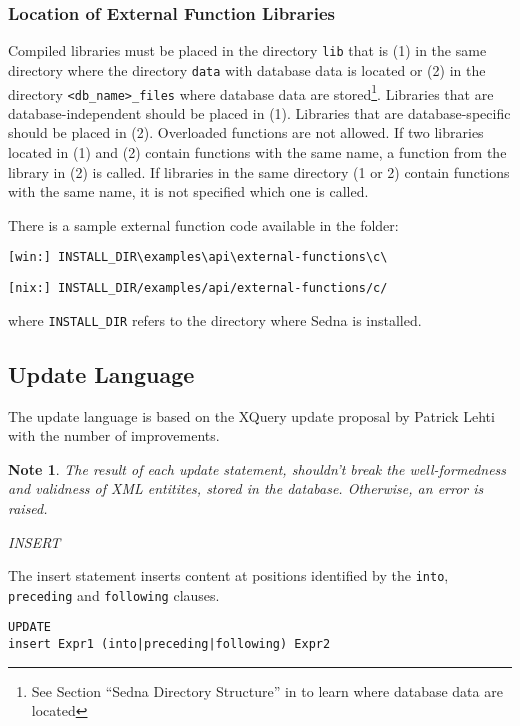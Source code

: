 \documentclass[a4paper,12pt]{article}
\newtheorem{note}{Note}
\begin{document}
\subsubsection*{Location of External Function Libraries}
Compiled libraries must be placed in the directory \verb!lib! that is (1) in the same directory
where the directory \verb!data! with database data is located or (2) in the directory \verb!<db_name>_files! where database data are stored\footnote{See Section ``Sedna Directory Structure'' in \cite{doc:admin} to learn where database data are located}. Libraries that are database-independent should be placed in (1). Libraries that are database-specific should be placed in (2). Overloaded functions are not allowed. If two libraries located in (1) and (2) contain functions with the same name, a function from the library in (2) is called. If libraries in the same directory (1 or 2) contain functions with the same name, it is not specified which one is called.

There is a sample external function code available in the folder:
\begin{verbatim}
[win:] INSTALL_DIR\examples\api\external-functions\c\
\end{verbatim}
\begin{verbatim}
[nix:] INSTALL_DIR/examples/api/external-functions/c/
\end{verbatim}
where \verb!INSTALL_DIR! refers to the directory where Sedna is installed.


\subsection{Update Language}
\label{upd-lang}
The update language is based on the XQuery update proposal by Patrick Lehti \cite{paper:query-update} with the number of improvements.

\begin{note}The result of each update statement, shouldn't break the well-formedness and validness of XML entitites, stored in the database.
Otherwise, an error is raised.
\end{note}

\emph{INSERT}

The insert statement inserts content at positions identified by the \verb!into!, \verb!preceding! and \verb!following! clauses.

\begin{verbatim}
UPDATE
insert Expr1 (into|preceding|following) Expr2
\end{verbatim}
\end{document}
